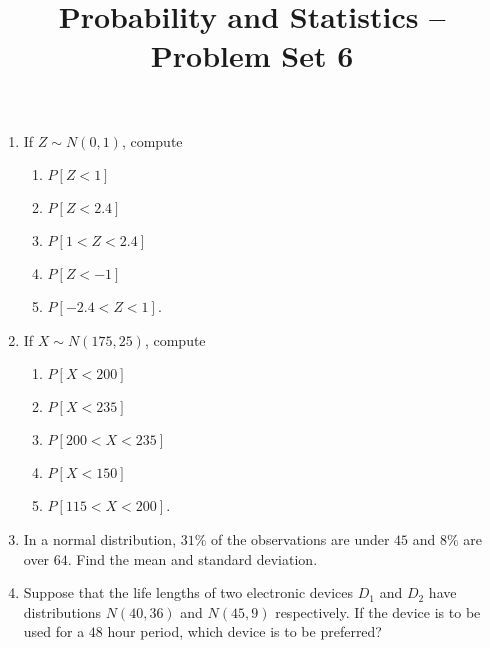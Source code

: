 \documentclass[svgnames]{amsart}
\title[]{Probability and Statistics -- Problem Set 6}
\begin{document}
\maketitle
\begin{enumerate}[leftmargin=*]
\item If $Z \sim N(0,1)$, compute
\begin{enumerate}
	\item $P[Z < 1]$
	\item $P[Z < 2.4]$
	\item $P[1 < Z < 2.4]$
	\item $P[Z < -1]$
	\item $P[-2.4 < Z < 1]$.
\end{enumerate}

\item If $X \sim N(175, 25)$, compute
\begin{enumerate}
	\item $P[X < 200]$
	\item $P[X < 235]$
	\item $P[200 < X < 235]$
	\item $P[X < 150]$
	\item $P[115 < X < 200]$.
\end{enumerate}

\item In a normal distribution, $31\%$ of the observations are under $45$ and $8\%$ are over $64$. Find the mean and standard deviation.

\item Suppose that the life lengths of two electronic devices $D_1$ and $D_2$ have distributions $N(40, 36)$ and $N(45, 9)$ respectively. If the device is to be used for a $48$ hour period, which device is to be preferred?
\end{enumerate}
\end{document}
